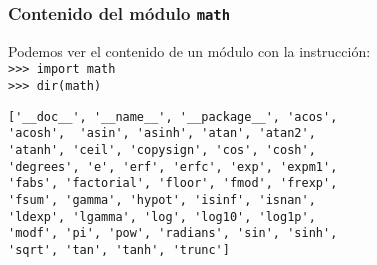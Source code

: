 \documentclass[12pt]{beamer}
\begin{document}
\begin{frame}[fragile]
\frametitle{Contenido del m\'{o}dulo \texttt{math}}
Podemos ver el contenido de un m\'{o}dulo con la instrucci\'{o}n:
\\
\verb|>>> import math| \\
\verb|>>> dir(math)|
\begin{verbatim}
['__doc__', '__name__', '__package__', 'acos',
'acosh',  'asin', 'asinh', 'atan', 'atan2',
'atanh', 'ceil', 'copysign', 'cos', 'cosh',
'degrees', 'e', 'erf', 'erfc', 'exp', 'expm1',
'fabs', 'factorial', 'floor', 'fmod', 'frexp',
'fsum', 'gamma', 'hypot', 'isinf', 'isnan',
'ldexp', 'lgamma', 'log', 'log10', 'log1p',
'modf', 'pi', 'pow', 'radians', 'sin', 'sinh',
'sqrt', 'tan', 'tanh', 'trunc']
\end{verbatim}
\end{frame}
\end{document}
